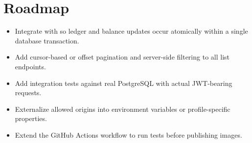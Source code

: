 \section{Roadmap}

\begin{itemize}
  \item Integrate  with  so ledger and balance updates occur atomically within a single database transaction.
  \item Add cursor-based or offset pagination and server-side filtering to all list endpoints.
  \item Add integration tests against real PostgreSQL with actual JWT-bearing requests.
  \item Externalize allowed origins into environment variables or profile-specific properties.
  \item Extend the GitHub Actions workflow to run tests before publishing images.
\end{itemize}
